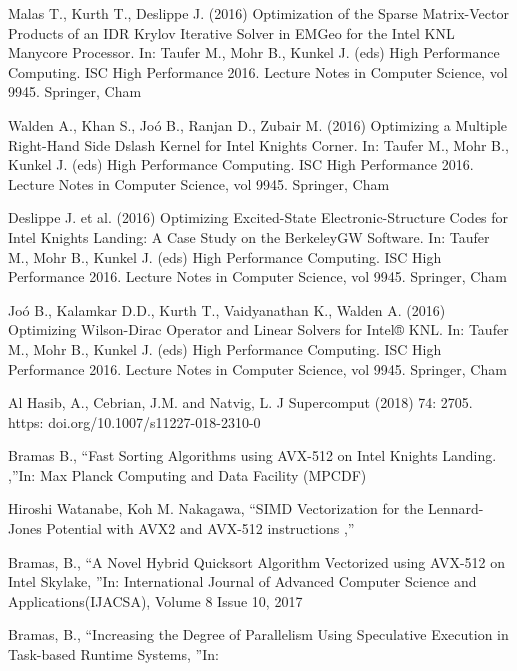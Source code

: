 \documentclass[
11pt,%
tightenlines,%
twoside,%
onecolumn,%
nofloats,%
nobibnotes,%
nofootinbib,%
superscriptaddress,%
noshowpacs,%
centertags]%
{revtex4}
\begin{document}
\begin{thebibliography}{99}
Malas T., Kurth T., Deslippe J. (2016) Optimization of the Sparse Matrix-Vector Products of an IDR Krylov Iterative Solver in EMGeo for the Intel KNL Manycore Processor. In: Taufer M., Mohr B., Kunkel J. (eds) High Performance Computing. ISC High Performance 2016. Lecture Notes in Computer Science, vol 9945. Springer, Cham

Walden A., Khan S., Joó B., Ranjan D., Zubair M. (2016) Optimizing a Multiple Right-Hand Side Dslash Kernel for Intel Knights Corner. In: Taufer M., Mohr B., Kunkel J. (eds) High Performance Computing. ISC High Performance 2016. Lecture Notes in Computer Science, vol 9945. Springer, Cham

Deslippe J. et al. (2016) Optimizing Excited-State Electronic-Structure Codes for Intel Knights Landing: A Case Study on the BerkeleyGW Software. In: Taufer M., Mohr B., Kunkel J. (eds) High Performance Computing. ISC High Performance 2016. Lecture Notes in Computer Science, vol 9945. Springer, Cham

Joó B., Kalamkar D.D., Kurth T., Vaidyanathan K., Walden A. (2016) Optimizing Wilson-Dirac Operator and Linear Solvers for Intel® KNL. In: Taufer M., Mohr B., Kunkel J. (eds) High Performance Computing. ISC High Performance 2016. Lecture Notes in Computer Science, vol 9945. Springer, Cham

Al Hasib, A., Cebrian, J.M. and Natvig, L. J Supercomput (2018) 74: 2705. https: doi.org/10.1007/s11227-018-2310-0

Bramas B., \textquotedblleft Fast Sorting Algorithms using AVX-512 on Intel Knights Landing. ,\textquotedblright In: Max Planck Computing and Data Facility (MPCDF)

Hiroshi Watanabe, Koh M. Nakagawa, \textquotedblleft SIMD Vectorization for the Lennard-Jones Potential with AVX2 and AVX-512 instructions ,\textquotedblright

Bramas, B., \textquotedblleft A Novel Hybrid Quicksort Algorithm Vectorized using AVX-512 on Intel Skylake, \textquotedblright In: International Journal of Advanced Computer Science and Applications(IJACSA), Volume 8 Issue 10, 2017

Bramas, B., \textquotedblleft Increasing the Degree of Parallelism Using Speculative Execution in Task-based Runtime Systems, \textquotedblright In:


\end{thebibliography}
\end{document}
